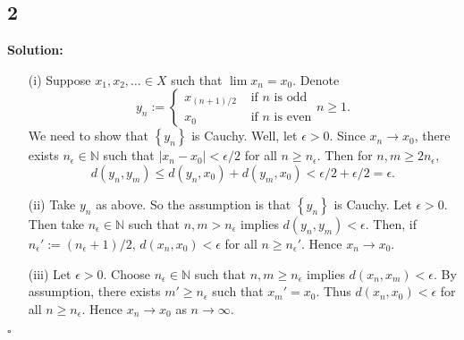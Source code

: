 \documentclass[12pt]{article}
\newcounter{ProofCounter}
\newenvironment{Solution}{\stepcounter{ProofCounter}\textbf{Solution:}}{\hfill$\square$}
\begin{document}
\newpage

\subsection*{2}
\begin{Solution}
\begin{enumerate}
  \item[(i)] Suppose $x_1, x_2, \dots \in X$ such that $\lim x_n = x_0$. Denote 
    \[
      y_n := \left\{ \begin{array}{cl}
          x_{(n+1)/2} & \text{ if $n$ is odd} \\
          x_0 & \text{ if $n$ is even}
      \end{array} \right. n \geq 1.
    \]
    We need to show that $\left\{ y_n \right\}$ is Cauchy. Well, let $\epsilon > 0$. Since $x_n \rightarrow x_0$, there exists $n_{\epsilon} \in
    \mathbb{N}$ such that $|x_n - x_0| < \epsilon / 2$ for all $n \geq n_{\epsilon}$. Then for $n,m \geq 2n_{\epsilon}$,
    \[
      d(y_n,y_m) \leq d(y_n, x_0) + d(y_m, x_0) < \epsilon / 2 + \epsilon / 2 = \epsilon.
    \]

  \item[(ii)] Take $y_n$ as above. So the assumption is that $\left\{ y_n \right\}$ is Cauchy. Let $\epsilon > 0$. Then take $n_{\epsilon} \in
    \mathbb{N}$ such that $n,m > n_{\epsilon}$ implies $d(y_n,y_m) < \epsilon$.
    Then, if $n_{\epsilon}' := (n_{\epsilon} + 1) / 2$, $d(x_n, x_0) < \epsilon$ for all $n \geq n_{\epsilon}'$. Hence $x_n \rightarrow x_0$.

  \item[(iii)] Let $\epsilon > 0$. Choose $n_{\epsilon} \in \mathbb{N}$ such that $n,m \geq n_{\epsilon}$ implies $d(x_n,x_m) < \epsilon$. By
    assumption, there exists $m' \geq n_{\epsilon}$ such that $x_m' = x_0$. Thus $d(x_n,x_0) < \epsilon$ for all $n \geq n_{\epsilon}$. Hence $x_n
    \rightarrow x_0$ as $n \rightarrow \infty$.
\end{enumerate}
\end{Solution}
\end{document}
